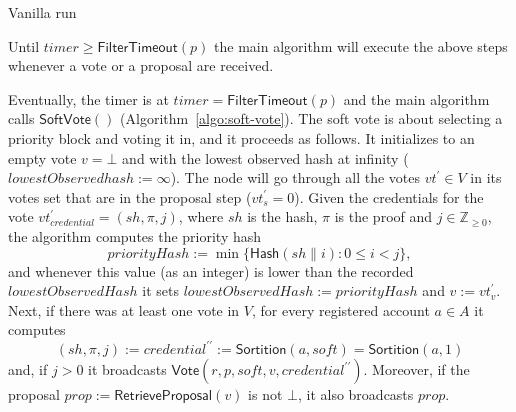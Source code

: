 \documentclass[10pt,a4paper]{article}
\begin{document}
\begin{section}{Vanilla run}
    
    
    Until $timer\ge \mathsf{FilterTimeout}(p)$ the main algorithm will execute the above steps
    whenever a vote or a proposal are received.
    
    Eventually, the timer is at $timer=\mathsf{FilterTimeout}(p)$ and the main algorithm calls 
    $\mathsf{SoftVote()}$ (Algorithm~\ref{algo:soft-vote}).
    The soft vote is about selecting a priority block and voting it in, and it proceeds as follows.
    It initializes to an empty vote $v=\bot$ and with the lowest observed hash at infinity ($lowestObservedhash:=\infty$).
    The node will go through all the votes $vt^\prime\in V$ in its votes set that are in the
    proposal step ($vt^\prime_s=0$).
    Given the credentials for the vote $vt^\prime_{credential}=(sh,\pi, j)$, where $sh$ is the hash,
    $\pi$ is the proof and $j\in\mathbb{Z}_{\geq 0}$, the algorithm computes the priority hash
    $$
    priorityHash:=\min\{\mathsf{Hash}(sh\| i): 0\le i<j\},
    $$
    and whenever this value (as an integer) is lower than the recorded 
    $lowestObservedHash$ it sets 
    $lowestObservedHash:=priorityHash$ and $v:=vt^\prime_v$.
    Next, if there was at least one vote in $V$, for every registered account $a\in A$
    it computes 
    $$
    (sh,\pi,j):=credential^{\prime\prime}:=\mathsf{Sortition}(a,soft)=\mathsf{Sortition}(a,1)
    $$
    and, if $j>0$ it broadcasts $\mathsf{Vote}(r,p,soft,v,credential^{\prime\prime})$.
    Moreover, if the proposal $prop:=\mathsf{RetrieveProposal}(v)$ is not $\bot$, it also broadcasts $prop$.
    

\end{section}
\end{document}
